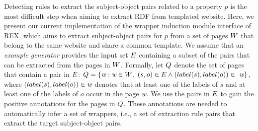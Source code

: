 \newcommand{\type}[1]{\mbox{\em \ensuremath{#1}}}

\newcommand{\dalvi}{DBLP:journals/pvldb/DalviKS11}
\newcommand{\mdl}{DBLP:journals/corr/math-ST-0406077}
\newcommand{\lixto}{DBLP:conf/pods/GottlobKBHF04}
\newcommand{\angluin}{DBLP:journals/tcs/Angluin04}
\newcommand{\myjacm}{DBLP:journals/jacm/CrescenziM04}
\newcommand{\SL}{DBLP:journals/tnn/Vapnik99}
\newcommand{\srm}{DBLP:journals/tit/Shawe-TaylorBWA98}
\newcommand{\ALsurvey}{settles.tr09}



Detecting rules to extract the subject-object pairs related to a property $p$ is the most difficult step when aiming to extract RDF from templated website.
Here, we present our current implementation of the wrapper induction module interface of REX, which aims to extract subject-object pairs for $p$ from a set of pages $\mbox{\ensuremath{W}}$ that belong to the same website and share a common template.
We assume that an \emph{example generator} provides the input set ${\mbox{\ensuremath{E}}}$ containing a subset of the pairs that can be extracted from the pages in $\mbox{\ensuremath{W}}$. 
Formally,  let $\mbox{\ensuremath{Q}}$ denote the set of pages that contain a pair in ${\mbox{\ensuremath{E}}}$: $\mbox{\ensuremath{Q}} = \{\mbox{\em w}: \mbox{\em w} \in \mbox{\ensuremath{W}},\ (s, o)\in {\mbox{\ensuremath{E}}} \wedge (label(s),label(o)) \in\ \mbox{\em w}\}$,
where  $(label(s),label(o)) \in \mbox{\em w}$ denotes that at least one of the labels of $s$ and at least one of the labels of $o$ occur in the page $\mbox{\em w}$. %
We use the pairs in ${\mbox{\ensuremath{E}}}$ to gain the positive annotations for the pages in $\mbox{\ensuremath{Q}}$. These  annotations are needed to automatically infer a set of wrappers, i.e., a set of extraction rule pairs that extract the target subject-object pairs.


